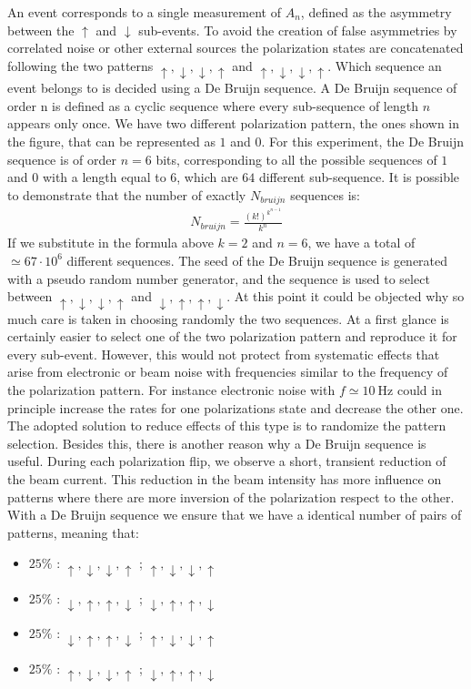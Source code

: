 An event corresponds to a single measurement of $A_{n}$, defined as the asymmetry between the $\uparrow$ and $\downarrow$ sub-events. To avoid the creation of false asymmetries by correlated noise or other external sources the polarization states are concatenated following the two patterns $\uparrow, \downarrow, \downarrow, \uparrow$ and $\uparrow, \downarrow, \downarrow, \uparrow$. Which sequence an event belongs to is decided using a De Bruijn sequence. A De Bruijn sequence of order n is defined as a cyclic sequence where every sub-sequence of length $n$ appears only once. We have two different polarization pattern, the ones shown in the figure, that can be represented as $1$ and $0$. For this experiment, the De Bruijn sequence is of order $n = 6$ bits, corresponding to all the possible sequences of $1$ and $0$ with a length equal to $6$, which are $64$ different sub-sequence.
It is possible to demonstrate that the number of exactly $N_{bruijn}$ sequences is: 
\begin{align*}
N_{bruijn} = \frac{(k!)^{k^{n-1}}}{k^{n}}
\end{align*}
If we substitute in the formula above $k=2$ and $n = 6$, we have a total of $\simeq 67 \cdot 10^{6}$ different sequences. The seed of the De Bruijn sequence is generated with a pseudo random number generator, and the sequence is used to select between $\uparrow,\downarrow,\downarrow, \uparrow$  and $\downarrow,\uparrow,\uparrow,\downarrow$. At this point it could be objected why so much care is taken in choosing randomly the two sequences. At a first glance is certainly easier to select one of the two polarization pattern and reproduce it for every sub-event. However, this would not protect from systematic effects that arise from electronic or beam noise with frequencies similar to the frequency of the polarization pattern. For instance electronic noise with  $ f \simeq \SI{10}{\hertz}$ could in principle increase the rates for one polarizations state and decrease the other one. The adopted solution to reduce effects of this type is to randomize the pattern selection. Besides this, there is another reason why a De Bruijn sequence is useful. During each polarization flip, we observe a short, transient reduction of the beam current. This reduction in the beam intensity has more influence on patterns where there are more inversion of the polarization respect to the other. With a De Bruijn sequence we ensure that we have a identical number of pairs of patterns, meaning that:


\begin{itemize}
\centering
\item $25\%$ : $\uparrow,\downarrow,\downarrow, \uparrow$ ; $\uparrow,\downarrow,\downarrow, \uparrow$
\item $25\%$ : $\downarrow,\uparrow, \uparrow,\downarrow$ ; $\downarrow,\uparrow, \uparrow,\downarrow$
\item $25\%$ : $\downarrow,\uparrow, \uparrow,\downarrow$ ; $\uparrow,\downarrow,\downarrow, \uparrow$
\item $25\%$ : $\uparrow,\downarrow,\downarrow, \uparrow$ ; $\downarrow,\uparrow, \uparrow,\downarrow$
\end{itemize}


